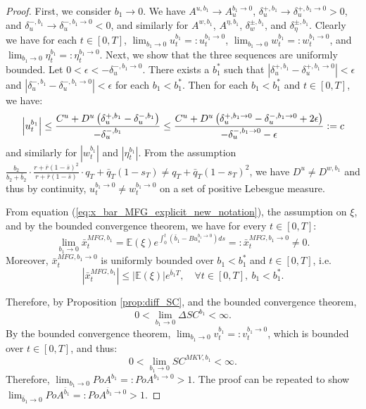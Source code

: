 \documentclass[11pt]{article}
\begin{document}
\begin{proof}
	First, we consider $b_1 \to 0$. We have $A^{u,b_1} \to A^{b_1\to 0}_u$, $\delta^{+,b_1}_u \to \delta^{+,b_1\to 0}_u>0$, and $\delta^{-,b_1}_u \to \delta^{-,b_1\to 0}_u<0$, and similarly for $A^{w,b_1}$, $A^{\eta,b_1}$, $\delta^{\pm,b_1}_w$, and $\delta^{\pm,b_1}_\eta$. Clearly we have for each $t\in[0,T]$, $\lim_{b_1 \to 0}u^{b_1}_t=:u^{b_1\to 0}_t$, $\lim_{b_1 \to 0}w^{b_1}_t=:w^{b_1 \to 0}_t$, and $\lim_{b_1 \to 0}\eta^{b_1}_t=:\eta^{b_1 \to 0}_t$. Next, we show that the three sequences are uniformly bounded. Let $0<\epsilon<-\delta^{-,b_1\to 0}_u$. There exists a $b_1^*$ such that $\left| \delta^{+,b_1}_u-\delta^{+,b_1\to0}_u \right|<\epsilon$ and $\left| \delta^{-,b_1}_u-\delta^{-,b_1\to0}_u \right|<\epsilon$ for each $b_1<b_1^*$. Then for each $b_1<b_1^*$ and $t\in[0,T]$, we have:
	\begin{equation*}
		\left|u^{b_1}_t\right| \leq \frac{C^u+D^u\left(\delta^{+,b_1}_u-\delta^{-,b_1}_u\right) }{-\delta^{-,b_1}_u} \\
		\leq \frac{C^u+D^u\left(\delta^{+,b_1\to 0}_u-\delta^{-,b_1 \to 0}_u+2\epsilon\right) }{-\delta^{-,b_1\to 0}_u-\epsilon} := c
	\end{equation*}
	and similarly for $\left|w^{b_1}_t\right|$ and $\left|\eta^{b_1}_t\right|$. From the assumption $\frac{b_2}{b_2+\bar{b}_2}\cdot \frac{r + \bar{r}(1- \bar{s})^2}{r + \bar{r}(1-\bar{s})}\cdot q_T+\bar{q}_T(1-s_T) \neq q_T+\bar{q}_T(1-s_T)^2$, we have $D^{u} \neq D^{w,b_1}$ and thus by continuity, $u^{b_1\to 0}_t \neq w^{b_1\to 0}_t$ on a set of positive Lebesgue measure.
	
	From equation (\ref{eq:x_bar_MFG_explicit_new_notation}), the assumption on $\xi$, and by the bounded convergence theorem, we have for every $t \in [0,T]$:
	\begin{equation*}
	\lim_{b_1\to 0}\bar{x}_t^{MFG,b_1} = \mathbb{E}(\xi) e^{\int_0^t(\bar{b}_1-B u^{b_1\to 0}_s)ds} =: \bar{x}_t^{MFG,b_1\to 0}\neq 0.
	\end{equation*}
	Moreover, $\bar{x}_t^{MFG,b_1\to 0}$ is uniformly bounded over $b_1<b_1^*$ and $t \in [0,T]$, i.e. 
	$$ \left\vert \bar{x}^{MFG,b_1}_t \right\vert \leq \left\vert \mathbb{E}(\xi) \right\vert e^{ \bar{b}_1 T }, \quad \forall t \in [0,T],\ b_1<b_1^*. $$ 
	
	Therefore, by Proposition \ref{prop:diff_SC}, and the bounded convergence theorem,
    \begin{equation*}
        0<\lim_{b_1 \to 0} \Delta SC^{b_1}<\infty.
    \end{equation*}
    By the bounded convergence theorem, $\lim_{b_1 \to 0}v^{b_1}_t=:v_t^{b_1 \to 0}$, which is bounded over $t\in [0,T]$, and thus:
    $$0<\lim_{b_1 \to 0} SC^{MKV,b_1}<\infty.$$
    Therefore, $\lim_{b_1 \to 0} PoA^{b_1} =: PoA^{b_1 \to 0} > 1$. The proof can be repeated to show $\lim_{\bar{b}_1 \to 0} PoA^{\bar{b}_1} =: PoA^{\bar{b}_1 \to 0} > 1$.
    


\end{proof}
\end{document}

